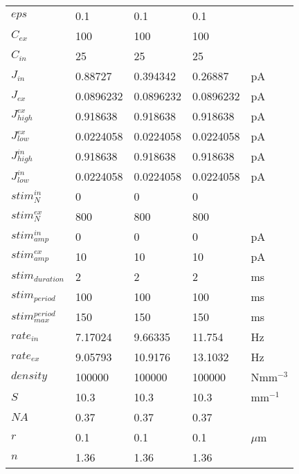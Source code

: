 \begin{tabular}{lllll}
$eps$                 &        0.1 &        0.1 &        0.1 &             \\
$C_{ex}$              &        100 &        100 &        100 &             \\
$C_{in}$              &         25 &         25 &         25 &             \\
$J_{in}$              &    0.88727 &   0.394342 &    0.26887 &          pA \\
$J_{ex}$              &  0.0896232 &  0.0896232 &  0.0896232 &          pA \\
$J_{high}^{ex}$       &   0.918638 &   0.918638 &   0.918638 &          pA \\
$J_{low}^{ex}$        &  0.0224058 &  0.0224058 &  0.0224058 &          pA \\
$J_{high}^{in}$       &   0.918638 &   0.918638 &   0.918638 &          pA \\
$J_{low}^{in}$        &  0.0224058 &  0.0224058 &  0.0224058 &          pA \\
$stim_{N}^{in}$       &          0 &          0 &          0 &             \\
$stim_{N}^{ex}$       &        800 &        800 &        800 &             \\
$stim_{amp}^{in}$     &          0 &          0 &          0 &          pA \\
$stim_{amp}^{ex}$     &         10 &         10 &         10 &          pA \\
$stim_{duration}$     &          2 &          2 &          2 &          ms \\
$stim_{period}$       &        100 &        100 &        100 &          ms \\
$stim_{max}^{period}$ &        150 &        150 &        150 &          ms \\
$rate_{in}$           &    7.17024 &    9.66335 &     11.754 &          Hz \\
$rate_{ex}$           &    9.05793 &    10.9176 &    13.1032 &          Hz \\
$density$             &     100000 &     100000 &     100000 &  Nmm$^{-3}$ \\
$S$                   &       10.3 &       10.3 &       10.3 &   mm$^{-1}$ \\
$NA$                  &       0.37 &       0.37 &       0.37 &             \\
$r$                   &        0.1 &        0.1 &        0.1 &      $\mu$m \\
$n$                   &       1.36 &       1.36 &       1.36 &             \\
\bottomrule
\end{tabular}
